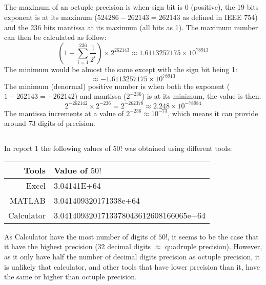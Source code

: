 \documentclass{article}
\begin{document}
\subsection{}
The maximum of an octuple precision is when sign bit is 0 (positive), the 19 bits exponent is at its maximum ($524286-262143=262143$ as defined in IEEE 754) and the 236 bits mantissa at its maximum (all bits as 1). The maximum number can then be calculated as follow: $$(1+\sum_{i=1}^{236}\frac{1}{2^i})\times2^{262143}\approx1.6113257175\times10^{78913}$$
The minimum would be almost the same except with the sign bit being 1:
$$\approx-1.6113257175\times10^{78913}$$
The minimum (denormal) positive number is when both the exponent ($1-262143=-262142$) and mantissa ($2^{-236}$) is at its minimum, the value is then:
$$2^{-262142}\times2^{-236}=2^{-262378}\approx2.248\times 10^{-78984}$$
The mantissa increments at a value of $2^{-236}\approx10^{-73}$, which means it can provide around 73 digits of precision.
\subsection{}
In report 1 the following values of $50!$ was obtained using different tools:
\begin{table}[H]
    \centering
    \begin{tabular}{rl}
            \toprule
            Tools&Value of $50!$\\
            \midrule
            Excel&3.04141E+64\\
            MATLAB&3.041409320171338e+64\\
            Calculator&3.0414093201713378043612608166065e+64\\
            \bottomrule
    \end{tabular}
\end{table}
As Calculator have the most number of digits of $50!$, it seems to be the case that it have the highest precision (32 decimal digits $\approx$ quadruple precision). However, as it only have half the number of decimal digits precision as octuple precision, it is unlikely that calculator, and other tools that have lower precision than it, have the same or higher than octuple precision.
\end{document}
